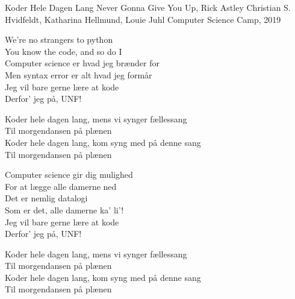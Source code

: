 \begin{song}{Koder Hele Dagen Lang}
  {} %
  {Never Gonna Give You Up, Rick Astley} %
  {Christian S. Hvidfeldt, Katharina Hellmund, Louie Juhl} %
  {Computer Science Camp, 2019} %
  {\NotCCLIed} %

  \begin{SBVerse}
    We’re no strangers to python \\
    You know the code, and so do I \\
    Computer science er hvad jeg brænder for \\
    Men syntax error er alt hvad jeg formår \\
    Jeg vil bare gerne lære at kode \\
    Derfor’ jeg på, UNF! \\
  \end{SBVerse}

  \begin{SBChorus}
    Koder hele dagen lang, mens vi synger fællessang \\
    Til morgendansen på plænen \\
    Koder hele dagen lang, kom syng med på denne sang \\
    Til morgendansen på plænen \\
  \end{SBChorus}

  \begin{SBVerse}
    Computer science gir dig mulighed \\
    For at lægge alle damerne ned \\
    Det er nemlig datalogi \\
    Som er det, alle damerne ka’ li’! \\
    Jeg vil bare gerne lære at kode \\
    Derfor’ jeg på, UNF! \\
  \end{SBVerse}

  \begin{SBChorus}
    Koder hele dagen lang, mens vi synger fællessang \\
    Til morgendansen på plænen \\
    Koder hele dagen lang, kom syng med på denne sang \\
    Til morgendansen på plænen \\
  \end{SBChorus}


\end{song}
